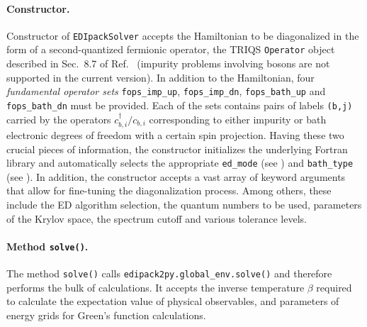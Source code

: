 \documentclass[edipack_sp.tex]{subfiles}
\begin{document}
\paragraph{{\bf Constructor}.}
Constructor of {\tt EDIpackSolver} accepts the Hamiltonian to be diagonalized
in the form of a second-quantized fermionic operator, the TRIQS {\tt Operator}
object described in Sec.~8.7 of Ref.~ (impurity 
problems involving bosons are not supported in the current version). In 
addition to the Hamiltonian, four {\it fundamental operator sets}
{\tt fops\_imp\_up}, {\tt fops\_imp\_dn}, {\tt fops\_bath\_up} and
{\tt fops\_bath\_dn} must be provided.
Each of the sets contains pairs of labels {\tt (b,j)} carried
by the operators $c^\dagger_{b,i} / c_{b,i}$ corresponding to either impurity
or bath electronic degrees of freedom with a certain spin projection.
Having these two crucial pieces of information, the constructor initializes
the underlying Fortran library and automatically selects the appropriate
{\tt ed\_mode} (see ) and
{\tt bath\_type} (see ). In addition, the
constructor accepts a vast array of keyword arguments that allow for fine-tuning
the diagonalization process. Among others, these include the ED algorithm
selection, the quantum numbers to be used, parameters of the Krylov space,
the spectrum cutoff and various tolerance levels.

\paragraph{{\bf Method {\tt solve()}}.}
The method {\tt solve()} calls
{\tt edipack2py.global\_env.solve()} and therefore performs the bulk of
calculations. It accepts the inverse temperature $\beta$ required to calculate
the expectation value of physical observables, and parameters of energy grids
for Green's function calculations.
\end{document}

